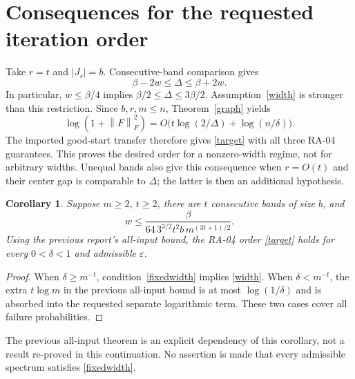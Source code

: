 \documentclass[11pt]{article}
\newtheorem{corollary}[theorem]{Corollary}
\newcommand{\norm}[1]{\left\lVert#1\right\rVert}
\begin{document}
\section{Consequences for the requested iteration order}
Take $r=t$ and $|J_s|=b$. Consecutive-band comparison gives
\[
 \beta-2w\le\Delta\le\beta+2w.
\]
In particular, $w\le\beta/4$ implies
$\beta/2\le\Delta\le3\beta/2$. Assumption~\eqref{width} is stronger than
this restriction. Since $b,r,m\le n$, Theorem~\ref{graph} yields
\[
 \log(1+\norm F_F^2)
 =O\bigl(t\log(2/\Delta)+\log(n/\delta)\bigr).
\]
The imported good-start transfer therefore gives \eqref{target} with all
three RA-04 guarantees. This proves the desired order for a nonzero-width
regime, not for arbitrary widths. Unequal bands also give this consequence
when $r=O(t)$ and their center gap is comparable to $\Delta$; the latter is
then an additional hypothesis.

\begin{corollary}\label{allfailure}
Suppose $m\ge2$, $t\ge2$, there are $t$ consecutive bands of size $b$, and
\begin{equation}\label{fixedwidth}
 w\le\frac{\beta}
 {64\,3^{3/2}t^2b\,m^{(3t+1)/2}}.
\end{equation}
Using the previous report's all-input bound, the RA-04 order
\eqref{target} holds for every $0<\delta<1$ and admissible $\varepsilon$.
\end{corollary}
\begin{proof}
When $\delta\ge m^{-t}$, condition~\eqref{fixedwidth} implies
\eqref{width}. When $\delta<m^{-t}$, the extra $t\log m$ in the previous
all-input bound is at most $\log(1/\delta)$ and is absorbed into the requested
separate logarithmic term. These two cases cover all failure probabilities.
\end{proof}
The previous all-input theorem is an explicit dependency of this corollary,
not a result re-proved in this continuation. No assertion is made that every
admissible spectrum satisfies \eqref{fixedwidth}.
\end{document}
